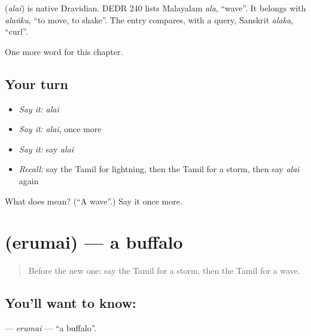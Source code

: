 \begin{cousinweb}
\textbf{} (\emph{alai}) is native Dravidian. DEDR 240 lists Malayalam \emph{ala}, \textquotedblleft{}wave\textquotedblright{}. It belongs with \emph{alaṅku}, \textquotedblleft{}to move, to shake\textquotedblright{}. The entry compares, with a query, Sanskrit \emph{alaka}, \textquotedblleft{}curl\textquotedblright{}.
\end{cousinweb}

\begin{grammarlens}[title={What you've built}]
One more word for this chapter.
\end{grammarlens}

\subsection*{Your turn}
\begin{itemize}
\raggedright
  \item \emph{Say it:} \emph{alai}
  \item \emph{Say it:} \emph{alai}, once more
  \item \emph{Say it:} say \emph{alai}
  \item \emph{Recall:} say the Tamil for lightning, then the Tamil for a storm, then say \emph{alai} again
\end{itemize}

\begin{tcolorbox}[breakable,colback=teal!4,colframe=teal!35!black,title={Before you move on}]
What does  mean? (\textquotedblleft{}A wave\textquotedblright{}.) Say it once more.
\end{tcolorbox}
\section[\texorpdfstring{\ta{எருமை} (erumai)}{எருமை (erumai)}]{ (erumai) — a buffalo}

\label{lesson:TA-C128-erumai}



\begin{quote}
Before the new one: say the Tamil for a storm, then the Tamil for a wave.
\end{quote}

\subsection*{You'll want to know: }
\textbf{} — \emph{erumai} — \textquotedblleft{}a buffalo\textquotedblright{}.

